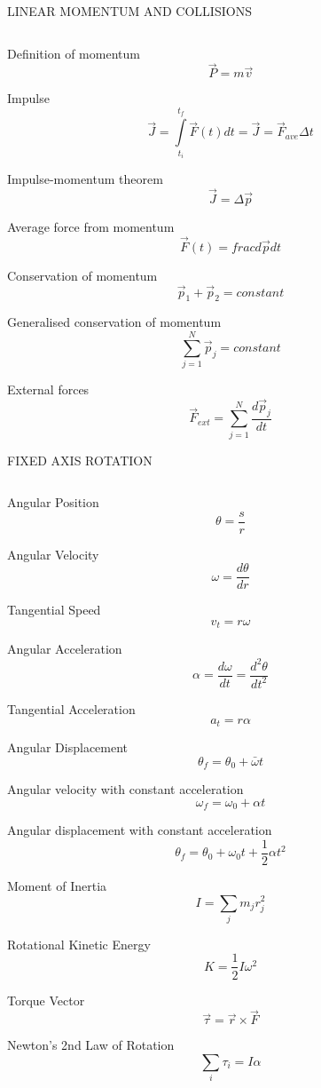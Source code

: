 \documentclass[12pt, letterpaper, twoside]{article}
\begin{document}
\newpage

LINEAR MOMENTUM AND COLLISIONS

$$ $$

Definition of momentum
$$ \overrightarrow{P} = m \overrightarrow{v} $$


Impulse
$$ \overrightarrow{J} = \int\limits_{t_i}^{t_f} \overrightarrow{F}(t) dt  = \overrightarrow{J} = \overrightarrow{F}_{ave} \Delta t $$


Impulse-momentum theorem
$$ \overrightarrow{J} = \Delta \overrightarrow{p}$$


Average force from momentum
$$ \overrightarrow{F} (t) = frac{d \overrightarrow{p}}{dt} $$


Conservation of momentum
$$  \overrightarrow{p}_1 +  \overrightarrow{p}_2 = constant $$


Generalised conservation of momentum
$$  \displaystyle\sum_{j=1}^{N} \overrightarrow{p}_j = constant $$



External forces
$$ \overrightarrow{F}_{ext} = \displaystyle\sum_{j=1}^{N} \frac{d \overrightarrow{p}_j}{dt} $$


\newpage



FIXED AXIS ROTATION

$$ $$


Angular Position
$$ \theta = \frac{s}{r} $$


Angular Velocity
$$ \omega = \frac{d \theta}{dr} $$


Tangential Speed
$$ v_t = r \omega $$

Angular Acceleration
$$ \alpha =\frac{d \omega}{dt} = \frac{d^2 \theta}{d t^2}$$


Tangential Acceleration
$$ a_t = r \alpha $$


Angular Displacement
$$ \theta_f = \theta_0 + \bar{\omega} t $$


Angular velocity with constant acceleration
$$ \omega_f = \omega_0 + \alpha t $$


Angular displacement with constant acceleration
$$ \theta_f = \theta_0 + \omega_0 t + \frac{1}{2} \alpha t^2 $$


Moment of Inertia
$$ I = \sum_j m_j r_j^2 $$


Rotational Kinetic Energy
$$ K = \frac{1}{2} I \omega^2 $$


Torque Vector
$$ \overrightarrow{\tau} = \overrightarrow{r} \times \overrightarrow{F}$$



Newton's 2nd Law of Rotation
$$ \sum_i \tau_i = I \alpha $$
\end{document}
